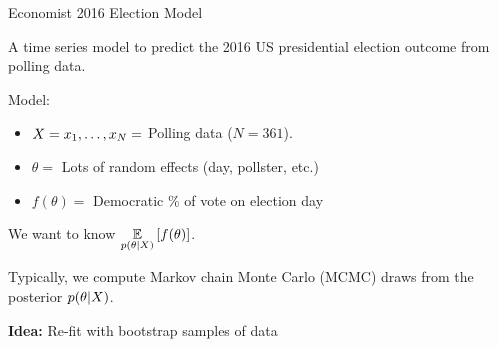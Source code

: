 
\begin{frame}{Economist 2016 Election Model \citep{economist:2020:election}}

\begin{minipage}[t]{0.4\textwidth}
    \ElectionData{}
\end{minipage}
\begin{minipage}[t]{0.59\textwidth}

A time series model to predict the 2016 US presidential election
outcome from polling data.

\spskip
Model:
\begin{itemize}
\item $X = x_1, \ldots, x_N =$ Polling data ($N = 361$).
\item $\theta = $ Lots of random effects (day, pollster, etc.)
\item $f(\theta) = $ Democratic \% of vote on election day
\end{itemize}

\spskip
We want to know $\underset{p(\theta \vert X)}{\mathbb{E}}\left[f(\theta)\right]$.

\spskip
Typically, we compute Markov chain Monte Carlo (MCMC) draws from the
posterior $p(\theta \vert X)$.


\end{minipage}


\pause



\pause

\textbf{Idea: } Re-fit with bootstrap samples of data \citep{huggins:2023:bayesbag}

%


\end{frame}







